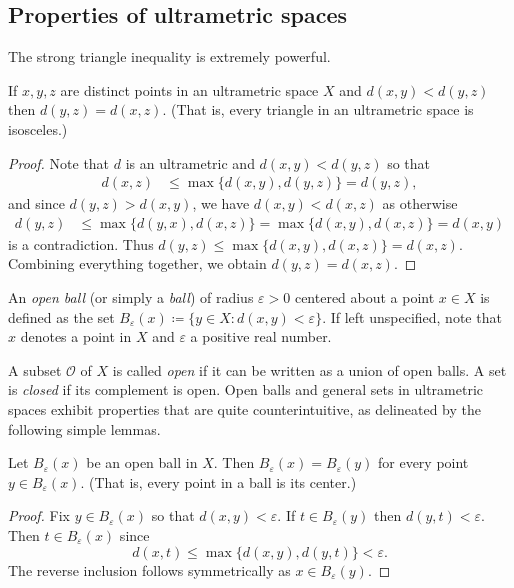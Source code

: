 \subsection{Properties of ultrametric spaces} The strong triangle inequality is extremely powerful.
\begin{lemma}
If \( x, y, z \) are distinct points in an ultrametric space \( X \) and \( d(x,y) < d(y,z) \) then \( d(y,z) = d(x,z) \). (That is, every triangle in an ultrametric space is isosceles.)
\end{lemma}
\begin{proof}
Note that \( d \) is an ultrametric and \( d(x,y) < d(y,z) \) so that
\begin{align*}
	d(x, z) &\leq \max \{ d(x,y), d(y, z) \} = d(y,z),
\end{align*}
and since \( d(y,z) > d(x,y) \), we have \( d(x,y) < d(x,z) \) as otherwise
\begin{align*}
	d(y,z) &\leq \max \{ d(y, x) , d(x, z) \} = \max \{ d(x,y) , d(x,z) \} = d(x,y)
\end{align*}
is a contradiction. Thus \( d(y,z) \leq \max \{ d(x,y), d(x,z) \} = d(x,z) \). Combining everything together, we obtain \( d(y,z) = d(x,z) \).
\end{proof}



An \emph{open ball} (or simply a \emph{ball}) of radius \( \varepsilon > 0 \) centered about a point \( x \in  X \) is defined as the set \( B_{\varepsilon }(x) \coloneqq \{ y \in X : d(x,y) < \varepsilon  \}  \). If left unspecified, note that \( x \) denotes a point in \( X \) and \( \varepsilon  \) a positive real number. 

A subset \( \mathcal{O}  \) of \( X \) is called \emph{open} if it can be written as a union of open balls. A set is \emph{closed} if its complement is open. Open balls and general sets in ultrametric spaces exhibit properties that are quite counterintuitive, as delineated by the following simple lemmas.
\begin{lemma}
Let \( B_{\varepsilon } (x) \) be an open ball in \( X \). Then \( B_{\varepsilon } (x) = B_{\varepsilon } (y) \) for every point \( y \in B_{\varepsilon } (x) \). (That is, every point in a ball is its center.)
\end{lemma}
\begin{proof}
Fix \( y \in B_{\varepsilon } (x) \) so that \( d(x,y) < \varepsilon  \). If \( t \in B_{\varepsilon } (y) \) then \( d(y,t) < \varepsilon  \). Then \( t \in B_{\varepsilon } (x) \) since \[ d(x, t) \leq \max \{ d(x,y), d(y,t) \} < \varepsilon . \] The reverse inclusion follows symmetrically as \( x \in B_{\varepsilon } (y) \).
\end{proof}

